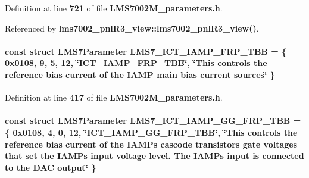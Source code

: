 Definition at line {\bf 721} of file {\bf L\+M\+S7002\+M\+\_\+parameters.\+h}.



Referenced by {\bf lms7002\+\_\+pnl\+R3\+\_\+view\+::lms7002\+\_\+pnl\+R3\+\_\+view()}.

\paragraph[{L\+M\+S7\+\_\+\+I\+C\+T\+\_\+\+I\+A\+M\+P\+\_\+\+F\+R\+P\+\_\+\+T\+BB}]{\setlength{\rightskip}{0pt plus 5cm}const struct {\bf L\+M\+S7\+Parameter} L\+M\+S7\+\_\+\+I\+C\+T\+\_\+\+I\+A\+M\+P\+\_\+\+F\+R\+P\+\_\+\+T\+BB = \{ 0x0108, 9, 5, 12, \char`\"{}\+I\+C\+T\+\_\+\+I\+A\+M\+P\+\_\+\+F\+R\+P\+\_\+\+T\+B\+B\char`\"{}, \char`\"{}\+This controls the reference bias current of the I\+A\+M\+P main bias current sources\char`\"{} \}\hspace{0.3cm}{\ttfamily [static]}}\label{LMS7002M__parameters_8h_a69129ef40919ffe9c08d04057b54032a}


Definition at line {\bf 417} of file {\bf L\+M\+S7002\+M\+\_\+parameters.\+h}.

\paragraph[{L\+M\+S7\+\_\+\+I\+C\+T\+\_\+\+I\+A\+M\+P\+\_\+\+G\+G\+\_\+\+F\+R\+P\+\_\+\+T\+BB}]{\setlength{\rightskip}{0pt plus 5cm}const struct {\bf L\+M\+S7\+Parameter} L\+M\+S7\+\_\+\+I\+C\+T\+\_\+\+I\+A\+M\+P\+\_\+\+G\+G\+\_\+\+F\+R\+P\+\_\+\+T\+BB = \{ 0x0108, 4, 0, 12, \char`\"{}\+I\+C\+T\+\_\+\+I\+A\+M\+P\+\_\+\+G\+G\+\_\+\+F\+R\+P\+\_\+\+T\+B\+B\char`\"{}, \char`\"{}\+This controls the reference bias current of the I\+A\+M\+P\textquotesingle{}s cascode transistors gate voltages that set the I\+A\+M\+P\textquotesingle{}s input voltage level. The I\+A\+M\+P\textquotesingle{}s input is connected to the D\+A\+C output\char`\"{} \}\hspace{0.3cm}{\ttfamily [static]}}\label{LMS7002M__parameters_8h_a485f5fc66155a1072f5d7ebbc365d580}


